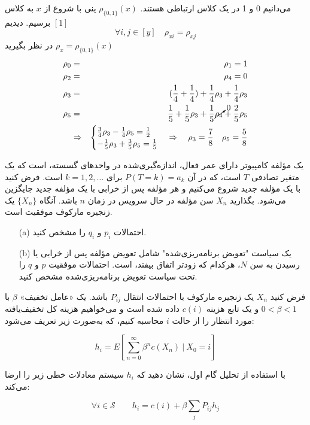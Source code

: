 \documentclass[11pt, a4, twoside]{article}
\begin{document}
\begin{problem}
\begin{itemize}
		{
			\color{blue} می‌دانیم 0 و 1 در یک کلاس ارتباطی هستند. \(\rho_{\{0,1\} } (x)\) ینی با شروع از \(x\) به کلاس \([1]\) برسیم. دیدیم \[ \forall i , j \in [y] \quad \rho_{xi} = \rho_{xj}\]
			\(\rho_x = \rho_{\{0,1\}}(x)\) در نظر بگیرید
			\begin{eqnarray*}
				\rho_0 &=& \rho_1 = 1 \\
				\rho_2 &=& \rho_4 = 0 \\
				\rho_3 &=& (\frac{1}{4} + \frac{1}{4}) + \frac{1}{4}\rho_3 + \frac{1}{4}\rho_3  \\
				\rho_5 &=& \frac{1}{5} + \frac{1}{5}\rho_3 + \frac{1}{5}\cancelto{0}{\rho_4} + \frac{2}{5}\rho_5 \\
				&\Rightarrow& 
				\begin{cases}
					\frac{3}{4}\rho_3 - \frac{1}{4}\rho_5  = \frac{1}{2} \\
					- \frac{1}{5}\rho_3 +\frac{3}{5}\rho_5 = \frac{1}{5}
				\end{cases} 
				\Rightarrow \quad \rho_3 = \frac{7}{8} \quad \rho_5 = \frac{5}{8}
			\end{eqnarray*} 
		} 
		\end{itemize}
	\end{problem}

	\begin{problem} %
    یک مؤلفه کامپیوتر دارای عمر فعال، اندازه‌گیری‌شده در واحدهای گسسته، است که یک متغیر تصادفی $T$ است، که در آن $P(T = k) = a_k$ برای $k = 1, 2, \dots$ است. فرض کنید با یک مؤلفه جدید شروع می‌کنیم و هر مؤلفه پس از خرابی با یک مؤلفه جدید جایگزین می‌شود. بگذارید $X_n$ سن مؤلفه در حال سرویس در زمان $n$ باشد. آنگاه $\{X_n\}$ یک زنجیره مارکوف موفقیت است.
    \begin{itemize}
        \item[(a)] احتمالات $p_i$ و $q_i$ را مشخص کنید.
        \item[(b)] یک سیاست "تعویض برنامه‌ریزی‌شده" شامل تعویض مؤلفه پس از خرابی یا رسیدن به سن $N$، هرکدام که زودتر اتفاق بیفتد، است. احتمالات موفقیت $p$ و $q$ را تحت سیاست تعویض برنامه‌ریزی‌شده مشخص کنید.
    \end{itemize} 
	\end{problem}

	\begin{problem} %
    فرض کنید $X_n$ یک زنجیره مارکوف با احتمالات انتقال $P_{ij}$ باشد. یک «عامل تخفیف» $\beta$ با $0 < \beta < 1$ و یک تابع هزینه $c(i)$ داده شده است و می‌خواهیم هزینه کل تخفیف‌یافته مورد انتظار را از حالت $i$ محاسبه کنیم، که به‌صورت زیر تعریف می‌شود:
    
    \[
    h_i = E\left[\sum_{n=0}^{\infty} \beta^n c(X_n) \ | \ X_0 = i\right]
    \]
    
    با استفاده از تحلیل گام اول، نشان دهید که $h_i$ سیستم معادلات خطی زیر را ارضا می‌کند:
    
    \[
    \forall i \in \mathcal{S} \qquad h_i = c(i) + \beta \sum_j P_{ij} h_j
    \] 

	\end{problem}
\end{document}
